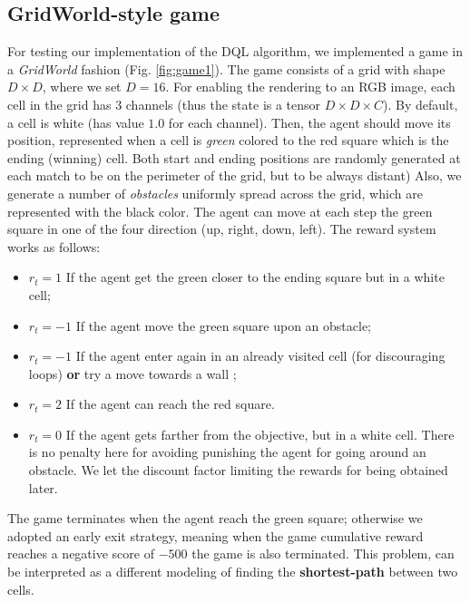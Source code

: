 \documentclass{article}
\begin{document}
\subsection{GridWorld-style game}
For testing our implementation of the DQL algorithm, we implemented a game in a \textit{GridWorld} fashion (Fig. \ref{fig:game1}). The game consists of a grid with shape $D \times D$, where we set $D = 16$. For enabling the rendering to an RGB image, each cell in the grid has $3$ channels (thus the state is a tensor $D \times D \times C$). By default, a cell is white (has value $1.0$ for each channel). Then, the agent should move its position, represented when a cell is \textit{green} colored to the red square which is the ending (winning) cell. Both start and ending positions are randomly generated at each match to be on the perimeter of the grid, but to be always distant)  Also, we generate a number of \textit{obstacles} uniformly spread across the grid, which are represented with the black color. The agent can move at each step the green square in one of the four direction (up, right, down, left).
The reward system works as follows:
\begin{itemize}
	\item $r_t = 1$ If the agent get the green closer to the ending square but in a white cell;
	\item $r_t = -1$ If the agent move the green square upon an obstacle;
	\item $r_t = -1$ If the agent enter again in an already visited cell (for discouraging loops) \textbf{or} try a move towards a wall ;
	\item $r_t = 2$ If the agent can reach the red square.
	\item $r_t = 0$ If the agent gets farther from the objective, but in a white cell. There is no penalty here for avoiding punishing the agent for going around an obstacle. We let the discount factor limiting the rewards for being obtained later.
\end{itemize}
The game terminates when the agent reach the green square; otherwise we adopted an early exit strategy, meaning when the game cumulative reward reaches a negative score of $-500$ the game is also terminated. 
This problem, can be interpreted as a different modeling of finding the \textbf{shortest-path} between two cells.
\end{document}
